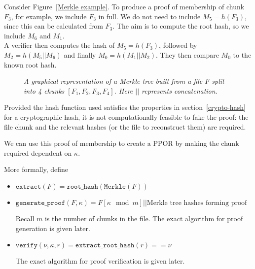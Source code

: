 \documentclass[10pt,twoside,a4paper]{article}
\begin{document}
Consider Figure~\ref{Merkle example}.
To produce a proof of membership of chunk $F_3$, for example, we include $F_3$ in full.
We do not need to include $M_5 = h(F_3)$, since this can be calculated from $F_3$.
The aim is to compute the root hash, so we include $M_6$ and $M_1$.\\
A verifier then computes the hash of $M_5 = h(F_3)$, followed by $M_2 = h(M_5 || M_6)$
and finally $M_0 = h(M_1 || M_2)$. They then compare $M_0$ to the known root hash.

\begin{figure}[h]
\centering
{}
\caption[A Merkle Tree proof of membership]{\em A graphical representation of a Merkle tree built from a file $F$ split into 4 chunks $[F_1, F_2, F_3, F_4]$.
Here $||$ represents concatenation.}
\label{Merkle proof}
\end{figure}


Provided the hash function used satisfies the properties in section~\ref{crypto-hash}
for a cryptographic hash, it is not computationally feasible to fake the proof: the file chunk and the relevant hashes (or the file to reconstruct them) are required.

We can use this proof of membership to create a PPOR by making the chunk required dependent on $\kappa$.

More formally, define
\begin{itemize}
\item $\texttt{extract}(F) = \texttt{root\_hash}(\texttt{Merkle}(F))$


\item $\texttt{generate\_proof}(F, \kappa) =
F[\kappa \mod m] || \text{Merkle tree hashes forming proof}$

Recall $m$ is the number of chunks in the file.
The exact algorithm for proof generation is given later.

\item $\texttt{verify}(\nu, \kappa, r) =
\texttt{extract\_root\_hash}(r) == \nu$

The exact algorithm for proof verification is given later.
\end{itemize}
\end{document}
